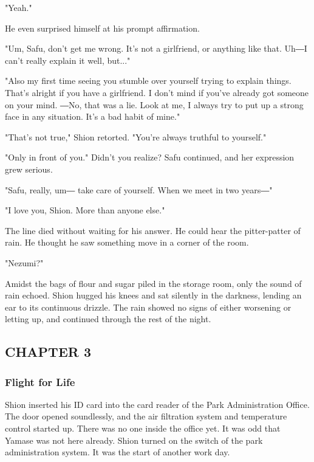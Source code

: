 "Yeah."

He even surprised himself at his prompt affirmation.

"Um, Safu, don't get me wrong. It's not a girlfriend, or anything like
that. Uh―I can't really explain it well, but..."

"Also my first time seeing you stumble over yourself trying to explain
things. That's alright if you have a girlfriend. I don't mind if you've
already got someone on your mind. ―No, that was a lie. Look at me, I
always try to put up a strong face in any situation. It's a bad habit of
mine."

"That's not true," Shion retorted. "You're always truthful to yourself."

"Only in front of you." Didn't you realize? Safu continued, and her
expression grew serious.

"Safu, really, um― take care of yourself. When we meet in two years―"

"I love you, Shion. More than anyone else."

The line died without waiting for his answer. He could hear the
pitter-patter of rain. He thought he saw something move in a corner of
the room.

"Nezumi?"

Amidst the bags of flour and sugar piled in the storage room, only the
sound of rain echoed. Shion hugged his knees and sat silently in the
darkness, lending an ear to its continuous drizzle. The rain showed no
signs of either worsening or letting up, and continued through the rest
of the night.

\hypertarget{index_split_024.htmlux5cux23calibre_pb_52}{}

\protect\hypertarget{index_split_051.html}{}{}

\hypertarget{index_split_051.htmlux5cux23calibre_pb_0}{}

\hypertarget{index_split_051.htmlux5cux23calibre_toc_4}{%
\subsection{CHAPTER 3}\label{index_split_051.htmlux5cux23calibre_toc_4}}

\subsubsection{Flight for Life}

Shion inserted his ID card into the card reader of the Park
Administration Office. The door opened soundlessly, and the air
filtration system and temperature control started up. There was no one
inside the office yet. It was odd that Yamase was not here already.
Shion turned on the switch of the park administration system. It was the
start of another work day.

